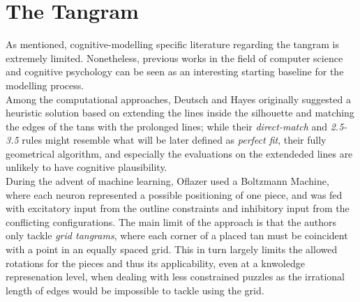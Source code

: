 \documentclass[a4paper,singleside,12pt]{report} %
\begin{document}
	\section{The Tangram}
	As mentioned, cognitive-modelling specific literature regarding the tangram is extremely limited. Nonetheless, previous works in the field
	of computer science and cognitive psychology can be seen as an interesting starting baseline for the modelling process. 
	\\Among the computational approaches, Deutsch and Hayes \cite{heuristic} originally suggested a heuristic solution based on extending the lines inside the silhouette and
	matching the edges of the tans with the prolonged lines; while their \textit{direct-match} and \textit{2.5-3.5} rules might resemble what will
	be later defined as \textit{perfect fit}, their fully geometrical algorithm, and especially the evaluations on the extendeded lines are unlikely 
	to have cognitive plausibility.\\
	During the advent of machine learning, Oflazer \cite{Oflazer1993SolvingTP} used a Boltzmann Machine, where each neuron represented a possible positioning of one piece, and was fed 
	with excitatory input from the outline constraints and inhibitory input from the conflicting configurations. The main limit of the approach is that the authors only tackle \textit{grid tangrams}, 
	where each corner of a placed tan must be coincident with a point in an equally spaced grid. This in turn largely limits the allowed rotations for the pieces and thus its applicability,
	even at a knwoledge represenation level, when dealing with less constrained puzzles as the irrational length of edges would be impossible to tackle using the grid. \\


    
	
\end{document}
